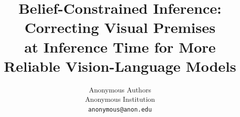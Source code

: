 \documentclass[10pt,twocolumn,letterpaper]{article}
\title{Belief-Constrained Inference: Correcting Visual Premises\\
at Inference Time for More Reliable Vision-Language Models}
\author{Anonymous Authors\\
Anonymous Institution\\
{\tt\small anonymous@anon.edu}
}
\begin{document}
\maketitle








{
    \small
    
    
}

% 
\end{document}

